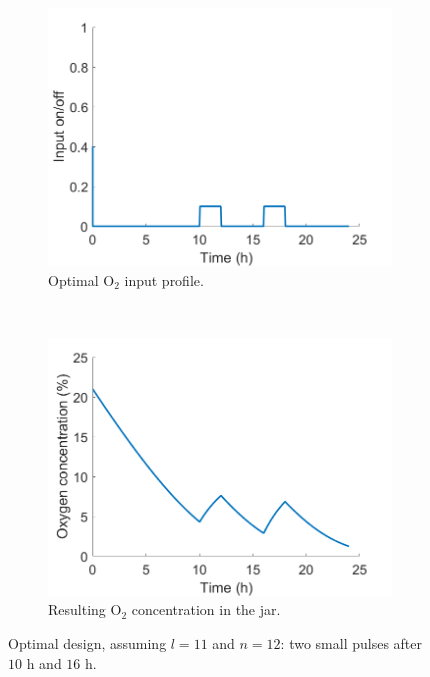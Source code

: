 \begin{figure}
	\centering
	\begin{subfigure}[b]{0.45\textwidth}
		\includegraphics[width=\textwidth]{figure/paper 1/input3.png}
		\caption{Optimal $\text{O}_2$ input profile.}
		\label{input3}
	\end{subfigure}
	~ %
	\begin{subfigure}[b]{0.45\textwidth}
		\includegraphics[width=\textwidth]{figure/paper 1/design3.png}
		\caption{Resulting $\text{O}_2$ concentration in the jar.}
		\label{output3}
	\end{subfigure}
	\caption{Optimal design, assuming $l = 11$ and $n = 12$: two small pulses after $10 \text{ h}$ and $16 \text{ h}$.}
	\label{figODE3}
\end{figure}

